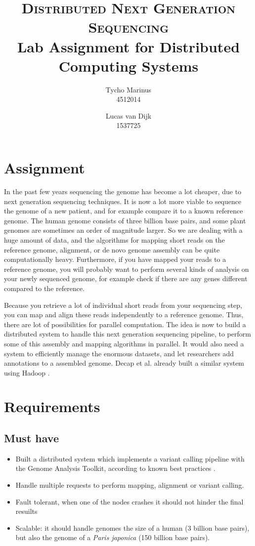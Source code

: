 \documentclass[a4paper,article,oneside]{memoir}
\title{\huge{\textsc{Distributed Next Generation Sequencing}}\\\Large{Lab Assignment for Distributed Computing Systems}}
\author{Tycho Marinus\\4512014 \and Lucas van Dijk\\1537725}
\begin{document}
\maketitle

\chapter{Assignment}

In the past few years sequencing the genome has become a lot cheaper, due to next generation sequencing techniques. It is now a lot more viable to sequence the genome of a new patient, and for example compare it to a known reference genome. The human genome consists of three billion base pairs, and some plant genomes are sometimes an order of magnitude larger. So we are dealing with a huge amount of data, and the algorithms for mapping short reads on the reference genome, alignment, or de novo genome assembly can be quite computationally heavy. Furthermore, if you have mapped your reads to a reference genome, you will probably want to perform several kinds of analysis on your newly sequenced genome, for example check if there are any genes different compared to the reference. 

Because you retrieve a lot of individual short reads from your sequencing step, you can map and align these reads independently to a reference genome. Thus, there are lot of possibilities for parallel computation. The idea is now to build a distributed system to handle this next generation sequencing pipeline, to perform some of this assembly and mapping algorithms in parallel. It would also need a system to efficiently manage the enormous datasets, and let researchers add annotations to a assembled genome. Decap et al. already built a similar system using Hadoop \cite{decap2015halvade}.

\chapter{Requirements}

\section{Must have}

\begin{itemize}
    \item Built a distributed system which implements a variant calling pipeline with the Genome Analysis Toolkit, according to known best practices \cite{auwera2013fastq}.
    \item Handle multiple requests to perform mapping, alignment or variant calling. 
    \item Fault tolerant, when one of the nodes crashes it should not hinder the final resuilts
    \item Scalable: it should handle genomes the size of a human (3 billion base pairs), but also the genome of a \textit{Paris japonica} (150 billion base pairs).
\end{itemize}
\end{document}
